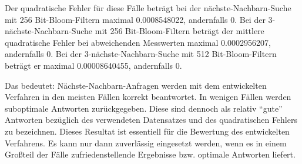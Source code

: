 Der quadratische Fehler für diese Fälle beträgt bei der nächste-Nachbarn-Suche mit 256 Bit-Bloom-Filtern maximal 0.0008548022, andernfalls 0. Bei der 3-nächste-Nachbarn-Suche mit 256 Bit-Bloom-Filtern beträgt der mittlere quadratische Fehler bei abweichenden Messwerten maximal 0.0002956207, andernfalls 0. Bei der 3-nächste-Nachbarn-Suche mit 512 Bit-Bloom-Filtern beträgt er maximal 0.00008640455, andernfalls 0.

Das bedeutet: Nächste-Nachbarn-Anfragen werden mit dem entwickelten Verfahren in den meisten Fällen korrekt beantwortet. In wenigen Fällen werden suboptimale Antworten zurückgegeben. Diese sind dennoch als relativ "`gute"' Antworten bezüglich des verwendeten Datensatzes und des quadratischen Fehlers zu bezeichnen. Dieses Resultat ist essentiell für die Bewertung des entwickelten Verfahrens. Es kann nur dann zuverlässig eingesetzt werden, wenn es in einem Großteil der Fälle zufriedenstellende Ergebnisse bzw. optimale Antworten liefert. 
